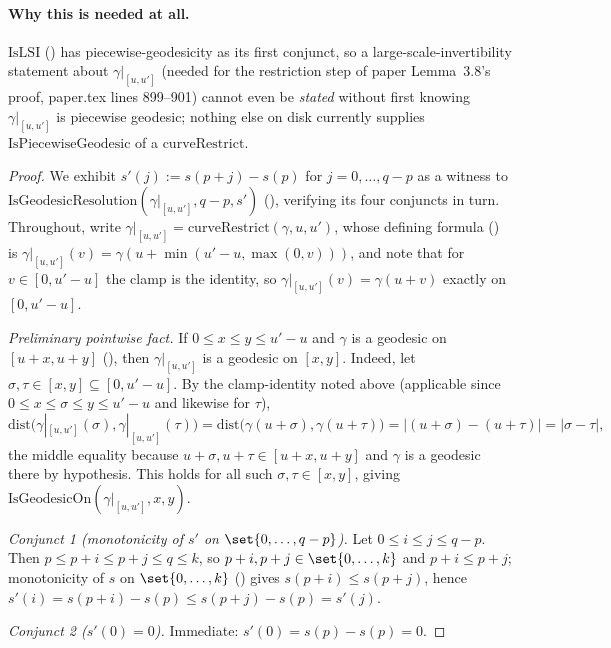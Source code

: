 \begin{lemma}
  \paragraph{Why this is needed at all.} $\mathrm{IsLSI}$ () has piecewise-geodesicity
  as its first conjunct, so a large-scale-invertibility statement about $\gamma|_{[u,u']}$ (needed
  for the restriction step of paper Lemma~3.8's proof, paper.tex lines 899--901) cannot even be
  \emph{stated} without first knowing $\gamma|_{[u,u']}$ is piecewise geodesic; nothing else on disk
  currently supplies $\mathrm{IsPiecewiseGeodesic}$ of a $\mathrm{curveRestrict}$.
\end{lemma}
\begin{proof}
  We exhibit $s'(j) := s(p+j)-s(p)$ for $j = 0,\dots,q-p$ as a witness to
  $\mathrm{IsGeodesicResolution}(\gamma|_{[u,u']}, q-p, s')$ (),
  verifying its four conjuncts in turn. Throughout, write $\gamma|_{[u,u']} =
  \mathrm{curveRestrict}(\gamma,u,u')$, whose defining formula () is
  $\gamma|_{[u,u']}(v) = \gamma(u + \min(u'-u,\max(0,v)))$, and note that for $v \in [0,u'-u]$ the
  clamp is the identity, so $\gamma|_{[u,u']}(v) = \gamma(u+v)$ exactly on $[0,u'-u]$.

  \emph{Preliminary pointwise fact.} If $0 \le x \le y \le u'-u$ and $\gamma$ is a geodesic on
  $[u+x,u+y]$ (), then $\gamma|_{[u,u']}$ is a geodesic on $[x,y]$. Indeed, let
  $\sigma,\tau \in [x,y] \subseteq [0,u'-u]$. By the clamp-identity noted above (applicable since
  $0 \le x \le \sigma \le y \le u'-u$ and likewise for $\tau$),
  \[
    \mathrm{dist}\bigl(\gamma|_{[u,u']}(\sigma), \gamma|_{[u,u']}(\tau)\bigr)
    = \mathrm{dist}\bigl(\gamma(u+\sigma), \gamma(u+\tau)\bigr)
    = |(u+\sigma)-(u+\tau)|
    = |\sigma - \tau|
    ,
  \]
  the middle equality because $u+\sigma, u+\tau \in [u+x,u+y]$ and $\gamma$ is a geodesic there by
  hypothesis. This holds for all such $\sigma,\tau \in [x,y]$, giving
  $\mathrm{IsGeodesicOn}(\gamma|_{[u,u']},x,y)$.

  \emph{Conjunct 1 (monotonicity of $s'$ on $\set{0,\dots,q-p}$).} Let $0 \le i \le j \le q-p$. Then
  $p \le p+i \le p+j \le q \le k$, so $p+i,p+j \in \set{0,\dots,k}$ and $p+i \le p+j$; monotonicity
  of $s$ on $\set{0,\dots,k}$ () gives $s(p+i) \le s(p+j)$, hence
  $s'(i) = s(p+i)-s(p) \le s(p+j)-s(p) = s'(j)$.

  \emph{Conjunct 2 ($s'(0)=0$).} Immediate: $s'(0) = s(p)-s(p) = 0$.


\end{proof}
